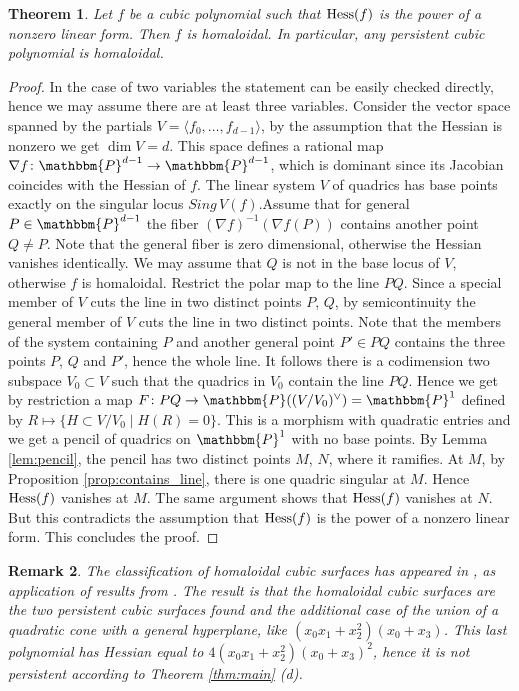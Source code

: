 \documentclass[aps,floatfix,groupedaddress,superscriptaddress,longbibliography,footinbib,notitlepage,showpacs]{revtex4-1}
\def\Hess{{\rm Hess}}
\newtheorem{theorem}{Theorem}
\newtheorem{remark}[theorem]{Remark}
\begin{document}
\begin{theorem}\cite[n.6]{Mam}
Let $f$ be a cubic polynomial such that $\Hess(f)$ is the power of a nonzero linear form. Then $f$ is homaloidal. In particular, any persistent cubic polynomial is homaloidal.
\end{theorem}
\begin{proof}
In the case of two variables the statement can be easily checked directly, hence we may assume there are at least three variables.
Consider the vector space spanned by the partials $V=\langle f_0,\ldots, f_{d-1}\rangle$,  by the assumption that the Hessian is nonzero we get $\dim V=d$.
This space defines a rational map $\nabla f\colon\mathbbm{P}^{d-1}\to\mathbbm{P}^{d-1}$, which is dominant since its Jacobian coincides with the Hessian of $f$.
The linear system $V$ of quadrics has base points exactly on the singular locus $Sing\,V(f)$.Assume that for general $P\in\mathbbm{P}^{d-1}$ the fiber $(\nabla f)^{-1}(\nabla f(P))$ contains another point $Q\neq P$. Note that the general fiber is zero dimensional, otherwise the Hessian vanishes identically. We may assume that $Q$ is not in the base locus of $V$, otherwise $f$ is homaloidal. Restrict the polar map to the line $PQ$. Since a special member of $V$ cuts the line in two distinct points $P$, $Q$, by semicontinuity the general member of $V$ cuts the line in two distinct points. Note that the members of the system containing $P$ and another general point $P'\in PQ$ contains the three points $P$, $Q$ and $P'$, hence the whole line. It follows there  is a codimension two subspace $V_0\subset V$ such that the quadrics in $V_0$ contain the line $PQ$. Hence we get by restriction a map $F\colon PQ\to\mathbbm{P}((V/V_0)^\vee)=\mathbbm{P}^1$
defined by $R\mapsto \{H\subset V/V_0 \mid H(R)=0\}$. This is a morphism with quadratic entries and we get a pencil of quadrics on $\mathbbm{P}^1$ with no base points. By Lemma \ref{lem:pencil},
the pencil has two distinct points $M$, $N$,
where it ramifies. At $M$, by Proposition \ref{prop:contains_line}, there is one quadric singular at $M$. Hence $\Hess(f)$ vanishes at $M$. The same argument shows that $\Hess(f)$ vanishes at $N$. But this contradicts the assumption that  $\Hess(f)$ is the power of a nonzero linear form. 
This concludes the proof.
\end{proof}

\begin{remark}\label{rem:ST} The classification of homaloidal cubic surfaces has appeared in \cite[\S 5.1]{ST}, as application of results from \cite{DP, Huh}. The result is that the homaloidal cubic surfaces are the two persistent cubic surfaces found and the additional case of the union of a quadratic cone with a general hyperplane,
like $(x_0x_1+x_2^2)(x_0+x_3)$.
This last polynomial has Hessian equal to
$4(x_0x_1+x_2^2)(x_0+x_3)^2$, hence it is not persistent according to Theorem \ref{thm:main} (d).
\end{remark}
\end{document}
